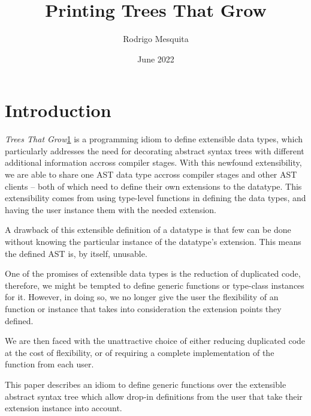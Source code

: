 \documentclass{article}
\title{Printing Trees That Grow}
\author{Rodrigo Mesquita}
\date{June 2022}
\begin{document}
\maketitle

\section{Introduction}

\emph{Trees That Grow}\ref{} is a programming idiom to define extensible data
types, which particularly addresses the need for decorating abstract syntax
trees with different additional information accross compiler stages. With this
newfound extensibility, we are able to share one AST data type accross compiler
stages and other AST clients -- both of which need to define their own
extensions to the datatype. This extensibility comes from using type-level
functions in defining the data types, and having the user instance them with the
needed extension.

A drawback of this extensible definition of a datatype is that few can be done
without knowing the particular instance of the datatype's extension.
This means the defined AST is, by itself, unusable.

One of the promises of extensible data types is the reduction of duplicated
code, therefore, we might be tempted to define generic functions or type-class
instances for it. However, in doing so, we no longer give the user the
flexibility of an function or instance that takes into consideration the
extension points they defined.

We are then faced with the unattractive choice of either reducing duplicated
code at the cost of flexibility, or of requiring a complete implementation of the
function from each user.

This paper describes an idiom to define generic functions over the extensible
abstract syntax tree which allow drop-in definitions from the user that take
their extension instance into account.
\end{document}
